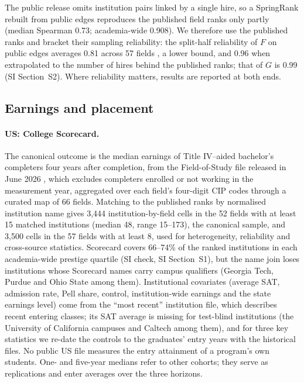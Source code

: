 \documentclass[11pt]{article}
\newcommand{\SI}[1]{SI Section~S#1}
\begin{document}
The public release omits institution pairs linked by a single hire, so a SpringRank rebuilt from public edges
reproduces the published field ranks only partly (median Spearman 0.73; academia-wide 0.908). We therefore use the
published ranks and bracket their sampling reliability: the split-half reliability of
$F$ on public edges averages 0.81 across 57 fields \citep[stepped up with the Spearman--Brown
formula;][]{spearman1910correlation, brown1910some}, a lower bound, and 0.96 when extrapolated to the number of
hires behind the published ranks; that of $G$ is 0.99 (\SI{2}). Where reliability matters, results are reported at
both ends.

\subsection{Earnings and placement}\label{sec:earnings}

\paragraph{US: College Scorecard.} The canonical outcome is the median earnings of Title IV--aided bachelor's
completers four years after completion, from the Field-of-Study file released in June 2026 \citep{scorecard},
which excludes completers enrolled or not working in the measurement year, aggregated over each field's four-digit
CIP codes through a curated map of 66 fields. Matching to the published ranks by normalised institution name
gives 3,444 institution-by-field cells in the 52 fields with at least 15 matched institutions (median 48, range
15--173), the canonical sample, and 3,500 cells in the 57 fields with at least 8, used for heterogeneity,
reliability and cross-source statistics. Scorecard covers 66--74\% of the ranked institutions in each
academia-wide prestige quartile (SI check, \SI{1}), but the name join loses institutions whose Scorecard names
carry campus qualifiers (Georgia Tech, Purdue and Ohio State among them). Institutional covariates (average SAT,
admission rate, Pell share, control, institution-wide earnings and the state earnings level) come from the ``most
recent'' institution file, which describes recent entering classes; its SAT average is missing for test-blind
institutions (the University of California campuses and Caltech among them), and for three key statistics we
re-date the controls to the graduates' entry years with the historical files. No public US file measures the
entry attainment of a program's own students. One- and five-year medians refer to other cohorts; they serve as
replications and enter averages over the three horizons.
\end{document}
